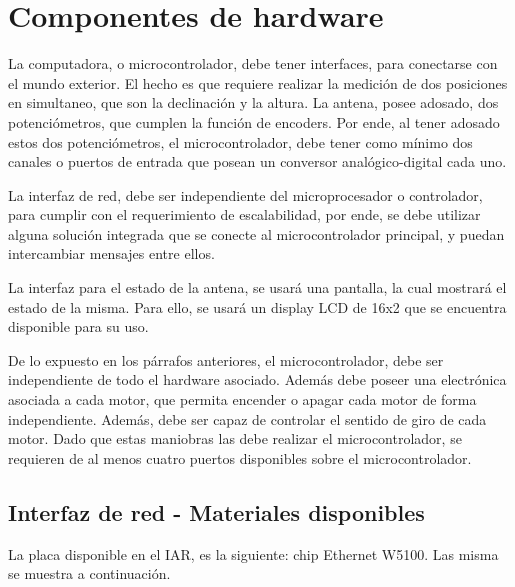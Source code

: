 \section{Componentes de hardware} \label{Sec_CompH}


La computadora, o microcontrolador, debe tener interfaces, para conectarse con el mundo exterior. El hecho es que requiere realizar la medición de dos posiciones en simultaneo, que son la declinación y la altura. La antena, posee adosado, dos potenciómetros, que cumplen la función de encoders. Por ende, al tener adosado estos dos potenciómetros, el microcontrolador, debe tener como mínimo dos canales o puertos de entrada que posean un conversor analógico-digital cada uno. 

La interfaz de red, debe ser independiente del microprocesador o controlador, para cumplir con el requerimiento de escalabilidad, por ende, se debe utilizar alguna solución integrada que se conecte al microcontrolador principal, y puedan intercambiar mensajes entre ellos. 

La interfaz para el estado de la antena, se usará una pantalla, la cual mostrará el estado de la misma. Para ello, se usará un display LCD de 16x2 que se encuentra disponible para su uso.


De lo expuesto en los párrafos anteriores, el microcontrolador, debe ser independiente de todo el hardware asociado. Además debe poseer una electrónica asociada a cada motor, que permita encender o apagar cada motor de forma independiente. Además, debe ser capaz de controlar el sentido de giro de cada motor. Dado que estas maniobras las debe realizar el microcontrolador, se requieren de al menos cuatro puertos disponibles sobre el microcontrolador. 


\subsection{Interfaz de red - Materiales disponibles}\label{Int_r} 

La placa disponible en el IAR, es la siguiente: chip Ethernet W5100. Las misma se muestra a continuación. 

